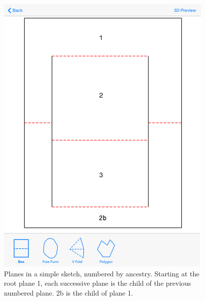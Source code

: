 \begin{figure}[htbp]
\centering
\includegraphics{figures/33_UI_Interface_Data_Structures/boxfold_planes.pdf}
\caption{Planes in a simple sketch, numbered by ancestry. Starting at
the root plane 1, each successive plane is the child of the previous
numbered plane. 2b is the child of plane 1.}
\end{figure}


